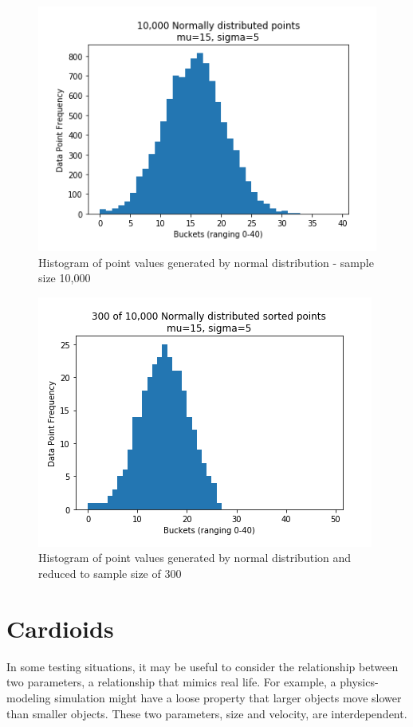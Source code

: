 \begin{figure}[H]
\centering
\includegraphics[scale=0.7]{law2.png}
\caption{Histogram of point values generated by normal distribution - sample size 10,000}
\label{fig:law2}
\end{figure}

\begin{figure}[H]
\centering
\includegraphics[scale=0.7]{law3.png}
\caption{Histogram of point values generated by normal distribution and reduced to sample size of 300}
\label{fig:law3}
\end{figure}


\section{Cardioids}

In some testing situations, it may be useful to consider the relationship between two parameters, a relationship that mimics real life. For example, a physics-modeling simulation might have a loose property that larger objects move slower than smaller objects. These two parameters, size and velocity, are interdependent.

